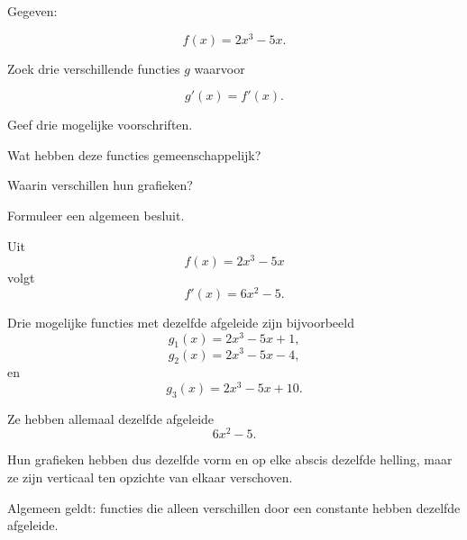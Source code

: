 \documentclass{ximera}
\begin{document}

\begin{oefening}{\oefU\ESS}

Gegeven:

\[
f(x)=2x^3-5x.
\]

Zoek drie verschillende functies $g$ waarvoor

\[
g'(x)=f'(x).
\]

\begin{question}
Geef drie mogelijke voorschriften.
\end{question}

\begin{question}
Wat hebben deze functies gemeenschappelijk?
\end{question}

\begin{question}
Waarin verschillen hun grafieken?
\end{question}

\begin{question}
Formuleer een algemeen besluit.
\end{question}

\begin{oplossing}

Uit
\[
f(x)=2x^3-5x
\]
volgt
\[
f'(x)=6x^2-5.
\]

Drie mogelijke functies met dezelfde afgeleide zijn bijvoorbeeld
\[
g_1(x)=2x^3-5x+1,
\]
\[
g_2(x)=2x^3-5x-4,
\]
en
\[
g_3(x)=2x^3-5x+10.
\]

Ze hebben allemaal dezelfde afgeleide
\[
6x^2-5.
\]

Hun grafieken hebben dus dezelfde vorm en op elke abscis dezelfde helling,
maar ze zijn verticaal ten opzichte van elkaar verschoven.

Algemeen geldt: functies die alleen verschillen door een constante hebben
dezelfde afgeleide.

\end{oplossing}

\end{oefening}


\end{document}
